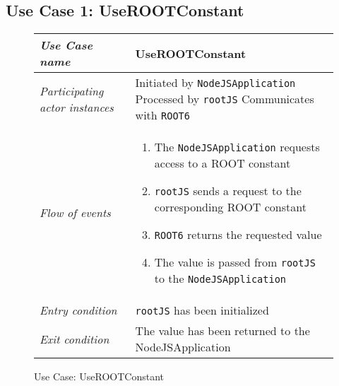 \subsection{Use Case 1: UseROOTConstant}

\begin{figure}[htb]
	\centering
	\begin{longtable}{p{3cm} @{\hskip 1cm} p{12cm}}
		\hline
		
		\textit{Use Case name} & UseROOTConstant\\
		\hline
		
		\textit{Participating actor instances} & Initiated by \texttt{NodeJSApplication}
                Processed by \texttt{rootJS}
                Communicates with \texttt{ROOT6}\\
		\hline
		
		\textit{Flow of events} &
			\begin{enumerate}
				\item The \texttt{NodeJSApplication} requests access to a ROOT constant
				\item \texttt{rootJS} sends a request to the corresponding ROOT constant
				\item \texttt{ROOT6} returns the requested value
	                        \item The value is passed from \texttt{rootJS} to the \texttt{NodeJSApplication}
			\end{enumerate}
			\\
		\hline
		
		\textit{Entry condition} & \texttt{rootJS} has been initialized\\
		\hline
		
		\textit{Exit condition} & The value has been returned to the NodeJSApplication\\
        \hline
	\end{longtable}
	
	\caption{Use Case: UseROOTConstant}
\end{figure}